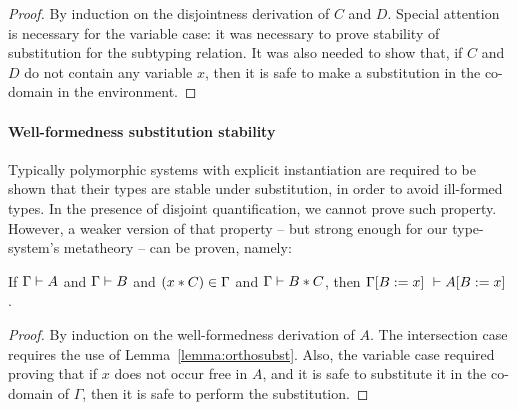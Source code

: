 \begin{proof}
  By induction on the disjointness derivation of $C$ and $D$.
  Special attention is necessary for the variable case: it was necessary to prove stability
  of substitution for the subtyping relation.
  It was also needed to show that, if $C$ and $D$ do not contain any variable $x$, then it is
  safe to make a substitution in the co-domain in the environment.
\end{proof}



\paragraph{Well-formedness substitution stability}
Typically polymorphic systems with explicit instantiation are required to be shown that their
types are stable under substitution, in order to avoid ill-formed types.
In the presence of disjoint quantification, we cannot prove such property.
However, a weaker version of that property -- but strong enough for our type-system's metatheory 
-- can be proven, namely:

\begin{lemma}
  \label{lemma:wfsubst}

  If $\jwf \Gamma A$ and $\jwf \Gamma B$ and $(x \disjoint C) \in \Gamma$ 
  and $\jdis \Gamma B C$, then $\jwf {\Gamma \subst x B} {A \subst x B}$.
\end{lemma}

%

\begin{proof}
By induction on the well-formedness derivation of $A$.
The intersection case requires the use of Lemma~\ref{lemma:orthosubst}.
Also, the variable case required proving that if $x$ does not occur free in $A$, and it is safe
to substitute it in the co-domain of $\Gamma$, then it is safe to perform the substitution.
\end{proof}

